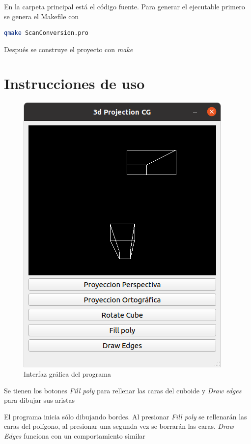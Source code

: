 \documentclass[12pt]{article}
\begin{document}
En la carpeta principal está el código fuente. Para generar el ejecutable primero se genera el Makefile con

\begin{lstlisting}[language=bash,title={bash}]
 qmake ScanConversion.pro
\end{lstlisting}

Después se construye el proyecto con \textit{make}



\section{Instrucciones de uso}

\begin{figure}[H]
\centering
\includegraphics[scale=0.5]{images/gui.png}
\caption{Interfaz gráfica del programa}
\end{figure}

Se tienen los botones \textit{Fill poly} para rellenar las caras del cuboide y \textit{Draw edges} para dibujar sus aristas

El programa inicia sólo dibujando bordes. Al presionar \textit{Fill poly} se rellenarán las caras del polígono, al presionar una segunda vez se borrarán las caras. \textit{Draw Edges} funciona con un comportamiento similar
\end{document}
